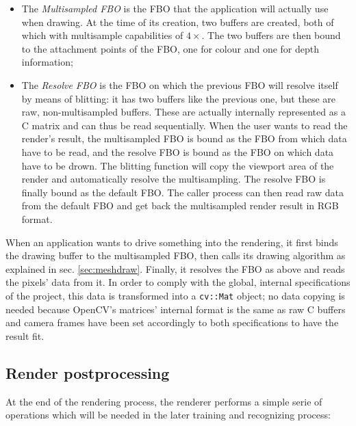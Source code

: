 \begin{itemize}
  \item{The \emph{Multisampled FBO} is the FBO that the application will
      actually use when drawing. At the time of its creation, two buffers are
      created, both of which with multisample capabilities of $4\times$. The two
      buffers are then bound to the attachment points of the FBO, one for colour
    and one for depth information;}
  \item{The \emph{Resolve FBO} is the FBO on which the previous FBO will resolve
      itself by means of blitting: it has two buffers like the previous one, but
      these are raw, non-multisampled buffers. These are actually internally
      represented as a C matrix and can thus be read sequentially.
      When the user wants to read the render's result, the multisampled FBO is bound
      as the FBO from which data have to be read, and the resolve FBO is bound
      as the FBO on which data have to be drown. The blitting function will copy
      the viewport area of the render and automatically resolve the
      multisampling. The resolve FBO is finally bound as the default FBO. The
      caller process can then read raw data from the default FBO and get
    back the multisampled render result in RGB format.}
\end{itemize}

When an application wants to drive something into the rendering, it first binds
the drawing buffer to the multisampled FBO, then calls its drawing algorithm as
explained in sec. \ref{sec:meshdraw}. Finally, it resolves the FBO as above and
reads the pixels' data from it. In order to comply with the global, internal
specifications of the project, this data is transformed into a \texttt{cv::Mat}
object; no data copying is needed because OpenCV's matrices' internal format is
the same as raw C buffers and camera frames have been set accordingly to both
specifications to have the result fit.

\subsection{Render postprocessing}
At the end of the rendering process, the renderer performs a simple serie of
operations which will be needed in the later training and recognizing process:

